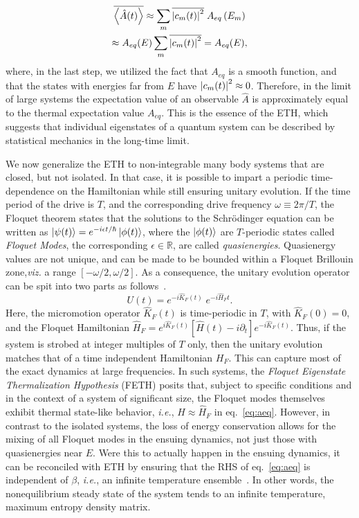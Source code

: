 \documentclass[%
reprint,
superscriptaddress,
amsmath,amssymb,
aps,
prb,
showkeys,
]{revtex4-2}
\begin{document}
\begin{multline*}
	\overline{\expval{\hat{A}(t)}} \approx \sum_m \overline{\abs{c_m(t)}^2}\; {A}_{eq}\left(E_m\right)\\
	\approx {A}_{eq}(E)\sum_m \overline{\abs{c_m(t)}^2} = A_{eq}(E),
\end{multline*}
where, in the last step, we utilized the fact that $A_{eq}$ is a smooth function, and that the states with energies far from $E$ have $\abs{c_m(t)}^2\approx 0$. Therefore, in the limit of large systems the expectation value of an observable $\hat{A}$ is approximately equal to the thermal expectation value $A_{eq}$. This is the essence of the ETH, which suggests that individual eigenstates of a quantum system can be described by statistical mechanics in the long-time limit.

We now generalize the ETH to non-integrable many body systems that are closed, but not isolated. In that case, it is possible to impart a periodic time-dependence on the Hamiltonian while still ensuring unitary evolution. If the time period of the drive is $T$, and the corresponding drive frequency $\omega\equiv 2\pi/T$, the Floquet theorem states that the solutions to the Schrödinger equation can be written as $\ket{\psi(t)} = e^{-i\epsilon t/\hbar} \ket{\phi(t)}$, where the $\ket{\phi(t)}$ are $T$-periodic states called \textit{Floquet Modes}, the corresponding $\epsilon\in \mathbb{R}$, are called \textit{quasienergies}. Quasienergy values are not unique, and can be made to be bounded within a Floquet {Brillouin zone},\textit{viz.} a range $[-\omega/2, \omega/2]$\cite{holthaus_floquet_2016,vogl_effective_2020}. As a consequence, the unitary evolution operator can be spit into two parts as follows~\cite{Bukov2014}.
\begin{equation}
	\label{eq:propagator}
	U(t) = e^{-i\hat{K}_F(t)}\;e^{-i\hat{H}_Ft}.
\end{equation}
Here, the micromotion operator $\hat{K}_F(t)$ is time-periodic in $T$, with $\hat{K}_F(0)=0$, and the Floquet Hamiltonian  {$\hat{H}_F = e^{i\hat{K}_F(t)} \left[\hat{H}(t)-i\partial_t\right] e^{-i \hat{K}_F(t)}$}. Thus, if the system is strobed at integer multiples of $T$ only, then the unitary evolution matches that of a time independent Hamiltonian $H_F$. This can capture most of the exact dynamics at large frequencies. In such systems, the \textit{Floquet Eigenstate Thermalization Hypothesis} (FETH)\cite{Mori_2018, Mori_2023_1} posits that, subject to specific conditions and in the context of a system of significant size, the Floquet modes themselves exhibit thermal state-like behavior, \textit{i.e.}, $\hat{H}\approx \hat{H}_F$ in eq.~\ref{eq:aeq}. However, in contrast to the isolated systems, the loss of energy conservation allows for the mixing of all Floquet modes in the ensuing dynamics, not just those with quasienergies near $E$. Were this to actually happen in the ensuing dynamics,  {it can be reconciled with ETH by ensuring that the RHS of eq.}~\ref{eq:aeq} {is independent of} $\beta$, \textit{i.e.}{, an infinite temperature ensemble}~\cite{alessio}. In other words, the nonequilibrium steady state of the system tends to an infinite temperature, maximum entropy density matrix.
\end{document}
